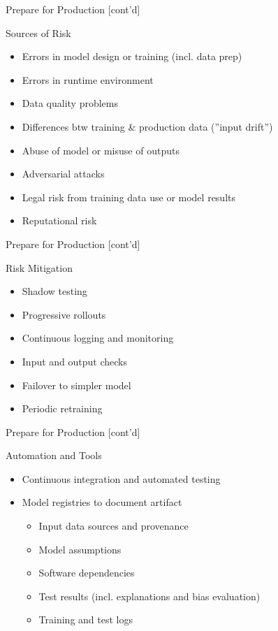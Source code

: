 \documentclass[ignorenonframetext,xcolor=x11names]{beamer}
\begin{document}
\begin{frame}{Prepare for Production \small [cont'd]}
\begin{block}{Sources of Risk}
\begin{itemize}
   \item Errors in model design or training (incl. data prep)
   \item Errors in runtime environment
   \item Data quality problems
   \item Differences btw training \& production data (''input drift'')
   \item Abuse of model or misuse of outputs
   \item Adversarial attacks
   \item Legal risk from training data use or model results
   \item Reputational risk
\end{itemize}
\end{block}
\end{frame}

\begin{frame}{Prepare for Production \small [cont'd]}
\begin{block}{Risk Mitigation}
\begin{itemize}
   \item Shadow testing
   \item Progressive rollouts
   \item Continuous logging and monitoring
   \item Input and output checks
   \item Failover to simpler model
   \item Periodic retraining
\end{itemize}
\end{block}
\end{frame}

\begin{frame}{Prepare for Production \small [cont'd]}
\begin{block}{Automation and Tools}
\begin{itemize}
   \item Continuous integration and automated testing
   \item Model registries to document artifact
   \begin{itemize}
      \item Input data sources and provenance
      \item Model assumptions
      \item Software dependencies
      \item Test results (incl. explanations and bias evaluation)
      \item Training and test logs
   \end{itemize}
\end{itemize}
\end{block}
\end{frame}   
\end{document}
